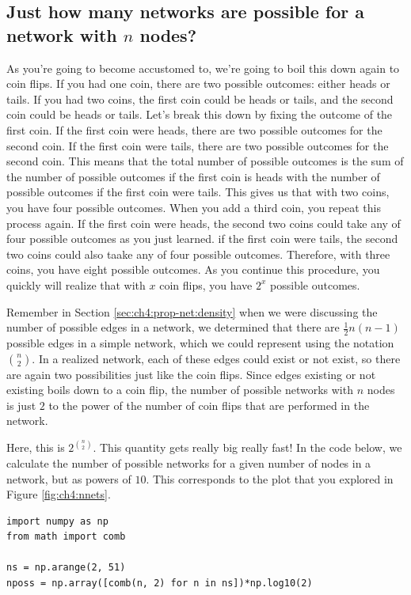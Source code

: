 \subsection{Just how many networks are possible for a network with $n$ nodes?}
 
As you're going to become accustomed to, we're going to boil this down again to coin flips. If you had one coin, there are two possible outcomes: either heads or tails. If you had two coins, the first coin could be heads or tails, and the second coin could be heads or tails. Let's break this down by fixing the outcome of the first coin. If the first coin were heads, there are two possible outcomes for the second coin. If the first coin were tails, there are two possible outcomes for the second coin. This means that the total number of possible outcomes is the sum of the number of possible outcomes if the first coin is heads with the number of possible outcomes if the first coin were tails. This gives us that with two coins, you have four possible outcomes. When you add a third coin, you repeat this process again. If the first coin were heads, the second two coins could take any of four possible outcomes as you just learned. if the first coin were tails, the second two coins could also taake any of four possible outcomes. Therefore, with three coins, you have eight possible outcomes. As you continue this procedure, you quickly will realize that with $x$ coin flips, you have $2^x$ possible outcomes. 

Remember in Section \ref{sec:ch4:prop-net:density} when we were discussing the number of possible edges in a network, we determined that there are $\frac{1}{2}n(n - 1)$ possible edges in a simple network, which we could represent using the notation $\binom n 2$. In a realized network, each of these edges could exist or not exist, so there are again two possibilities just like the coin flips. Since edges existing or not existing boils down to a coin flip, the number of possible networks with $n$ nodes is just $2$ to the power of the number of coin flips that are performed in the network. 

Here, this is $2^{\binom n 2}$. This quantity gets {really} big {really} fast! In the code below, we calculate the number of possible networks for a given number of nodes in a network, but as powers of $10$. This corresponds to the plot that you explored in Figure \ref{fig:ch4:nnets}.


\begin{lstlisting}[style=python]
import numpy as np
from math import comb

ns = np.arange(2, 51)
nposs = np.array([comb(n, 2) for n in ns])*np.log10(2)
\end{lstlisting}

